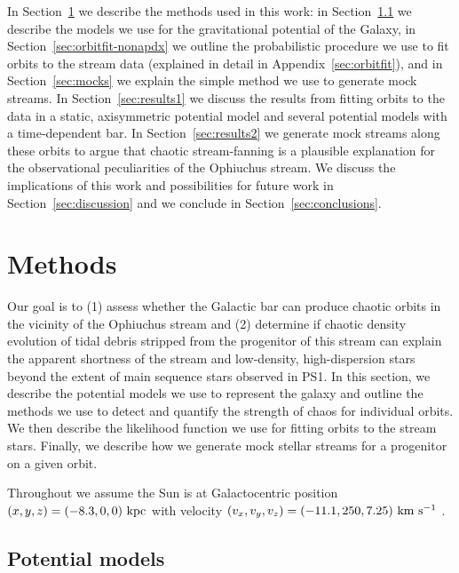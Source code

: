 In Section~\ref{sec:method} we describe the methods used in this work: in Section~\ref{sec:potential} we describe the models we use for the gravitational potential of the Galaxy, in Section~\ref{sec:orbitfit-nonapdx} we outline the probabilistic procedure we use to fit orbits to the stream data (explained in detail in Appendix~\ref{sec:orbitfit}), and in Section~\ref{sec:mocks} we explain the simple method we use to generate mock streams. In Section~\ref{sec:results1} we discuss the results from fitting orbits to the data in a static, axisymmetric potential model and several potential models with a time-dependent bar. In Section~\ref{sec:results2} we generate mock streams along these orbits to argue that chaotic stream-fanning is a plausible explanation for the observational peculiarities of the Ophiuchus stream. We discuss the implications of this work and possibilities for future work in Section~\ref{sec:discussion} and we conclude in Section~\ref{sec:conclusions}.

\section{Methods}\label{sec:method}

Our goal is to (1) assess whether the Galactic bar can produce chaotic orbits in the vicinity of the Ophiuchus stream and (2) determine if chaotic density evolution of tidal debris stripped from the progenitor of this stream can explain the apparent shortness of the stream and low-density, high-dispersion stars beyond the extent of main sequence stars observed in PS1. In this section, we describe the potential models we use to represent the galaxy and outline the methods we use to detect and quantify the strength of chaos for individual orbits. We then describe the likelihood function we use for fitting orbits to the stream stars. Finally, we describe how we generate mock stellar streams for a progenitor on a given orbit. 

Throughout we assume the Sun is at Galactocentric position $(x,y,z) = (-8.3,0,0)~{\rm kpc}$ \citep[e.g.,][]{schoenrich12} with velocity $(v_x,v_y,v_z) = (-11.1, 250, 7.25)~\mathrm{km}~\mathrm{s}^{-1}$ \citep[e.g.,][]{schoenrich10, schoenrich12}.

\subsection{Potential models}\label{sec:potential}

